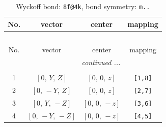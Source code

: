 \documentclass[fleqn,8pt]{jsarticle}
\begin{document}
\renewcommand{\arraystretch}{1.2}
\begin{longtable}{cccc}
\caption{Wyckoff bond: {\tt 8f@4k}, bond symmetry: {\tt m..}}
 \\
 \hline \hline
No. & vector & center & mapping \\ \hline \endfirsthead

\multicolumn{3}{l}{\tablename\ \thetable{}} \\
 \hline \hline
No. & vector & center & mapping \\ \hline \endhead

 \hline \hline
\multicolumn{3}{r}{\footnotesize\it continued ...} \\ \endfoot

 \hline \hline
\multicolumn{3}{r}{} \\ \endlastfoot

1 & $\left[ 0,\, Y,\, Z \right]$ & $\left[ 0,\, 0,\, z \right]$ & {\tt [1,8]} \\ \hline
2 & $\left[ 0,\, - Y,\, Z \right]$ & $\left[ 0,\, 0,\, z \right]$ & {\tt [2,7]} \\ \hline
3 & $\left[ 0,\, Y,\, - Z \right]$ & $\left[ 0,\, 0,\, - z \right]$ & {\tt [3,6]} \\ \hline
4 & $\left[ 0,\, - Y,\, - Z \right]$ & $\left[ 0,\, 0,\, - z \right]$ & {\tt [4,5]} \\
\end{longtable}
\renewcommand{\arraystretch}{1.2}
\end{document}

